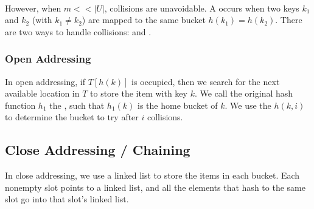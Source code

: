 {~~~}

However, when $m << |U|$, collisions are unavoidable. A  occurs when two keys $k_1$ and $k_2$ (with $k_1 \neq k_2$) are mapped to the same bucket $h(k_1) = h(k_2)$. There are two ways to handle collisions:  and .

\subsubsection{Open Addressing}

In open addressing, if $T[h(k)]$ is occupied, then we search for the next available location in $T$ to store the item with key $k$. We call the original hash function $h_1$ the , such that $h_1(k)$ is the home bucket of $k$. We use the  $h(k, i)$ to determine the bucket to try after $i$ collisions. 


\subsection{Close Addressing / Chaining}

In close addressing, we use a linked list to store the items in each bucket. Each nonempty slot points to a linked list, and all the elements that hash to the same slot go into that slot's linked list. 